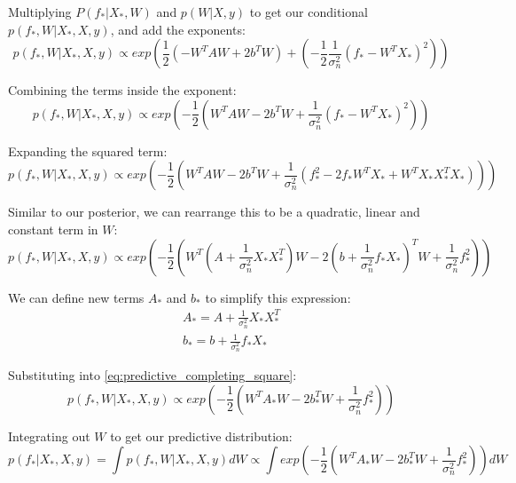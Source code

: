 Multiplying $P(f_*|X_*,W)$ and $p(W|X,y)$ to get our conditional $p(f_*, W|X_*,X,y)$, and add the exponents: 
\begin{equation*}
    p(f_*,W|X_*,X,y) \propto exp\left(\frac{1}{2}(-W^TAW + 2b^TW) + \left(-\frac{1}{2}\frac{1}{\sigma^2_n}(f_* - W^TX_*)^2\right)\right)
\end{equation*}

Combining the terms inside the exponent:
\begin{equation*}
    p(f_*,W|X_*,X,y) \propto exp\left(-\frac{1}{2}\left(W^TAW - 2b^TW + \frac{1}{\sigma^2_n}(f_* - W^TX_*)^2\right)\right)
\end{equation*}

Expanding the squared term:
\begin{equation*}
    p(f_*,W|X_*,X,y) \propto exp\left(-\frac{1}{2}\left(W^TAW - 2b^TW + \frac{1}{\sigma^2_n}(f_*^2 - 2f_*W^TX_* + W^TX_*X_*^TX_*)\right)\right)
\end{equation*}

Similar to our posterior, we can rearrange this to be a quadratic, linear and constant term in $W$:
\begin{equation} \label{eq:predictive_completing_square}
    p(f_*,W|X_*,X,y) \propto exp\left(-\frac{1}{2}\left(W^T\left(A + \frac{1}{\sigma^2_n}X_*X_*^T\right)W - 2\left(b + \frac{1}{\sigma^2_n}f_*X_*\right)^TW + \frac{1}{\sigma_n^2}f_*^2\right)\right)
\end{equation}

We can define new terms $A_*$ and $b_*$ to simplify this expression:
\begin{equation*}
    \begin{aligned}
        A_* = A + \frac{1}{\sigma^2_n}X_*X_*^T \\
        b_* = b + \frac{1}{\sigma^2_n}f_*X_*
    \end{aligned}
\end{equation*}

Substituting into \ref{eq:predictive_completing_square}:
\begin{equation*}
    p(f_*,W|X_*,X,y) \propto exp\left(-\frac{1}{2}\left(W^TA_*W - 2b_*^TW + \frac{1}{\sigma_n^2}f_*^2\right)\right)
\end{equation*}

Integrating out $W$ to get our predictive distribution:
\begin{equation} \label{eq:predictive_distribution_1}
    p(f_*|X_*,X,y) = \int p(f_*,W|X_*,X,y)dW \propto \int exp\left(-\frac{1}{2}\left(W^TA_*W - 2b_*^TW + \frac{1}{\sigma_n^2}f_*^2\right)\right)dW
\end{equation}

